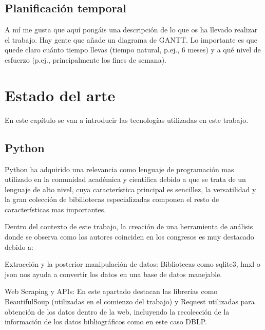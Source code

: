 \documentclass[a4paper, 12pt]{book}
\begin{document}
\section{Planificación temporal}
\label{sec:planificacion-temporal}

A mí me gusta que aquí pongáis una descripción de lo que os ha llevado realizar el trabajo.
Hay gente que añade un diagrama de GANTT.
Lo importante es que quede claro cuánto tiempo llevas (tiempo natural, p.ej., 6 meses) y a qué nivel de esfuerzo (p.ej., principalmente los fines de semana).



\cleardoublepage
\chapter{Estado del arte}
\label{chap:estado}

        En este capítulo se van a introducir las tecnologías utilizadas en este trabajo.

\section{Python} 
\label{sec:seccion1}

Python ha adquirido una relevancia como lenguaje de programación mas utilizado en la comunidad académica y científica debido a que se trata de un lenguaje de alto nivel, cuya característica principal es sencillez, la versatilidad y la gran colección de bibiliotecas especializadas componen el resto de características mas importantes.

Dentro del contexto de este trabajo, la creación de una herramienta de análisis donde se observa como los autores coinciden en los congresos es muy destacado debido a:

Extracción y la posterior manipulación de datos: Bibliotecas como sqlite3, lmxl o json nos ayuda a convertir los datos en una base de datos manejable.

Web Scraping y APIs: En este apartado destacan las librerías como BeautifulSoup (utilizadas en el comienzo del trabajo) y Request utilizadas para obtención de los datos dentro de la web, incluyendo la recolección de la información de los datos bibliográficos como en este caso DBLP.
\end{document}

